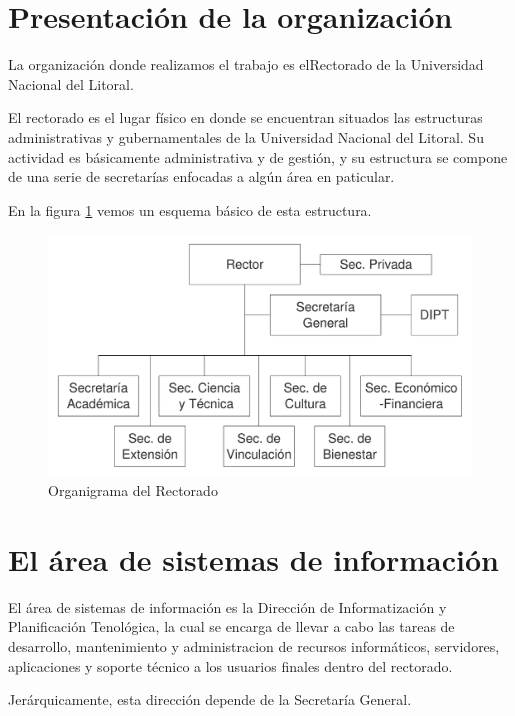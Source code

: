 \documentclass[a4paper,11pt,oneside]{article}
\begin{document}
\maketitle
%
%
\section{Presentación de la organización}
%
La organización donde realizamos el trabajo es elRectorado de la Universidad
Nacional del Litoral.

El rectorado es el lugar físico en donde se encuentran situados las
estructuras administrativas y gubernamentales de la Universidad
Nacional del Litoral.
Su actividad es básicamente administrativa y de gestión, y su estructura
se compone de una serie de secretarías enfocadas a algún área en
paticular.

En la figura \ref{organi-rectorado} vemos un esquema básico de esta
estructura.
%
\begin{figure}[H]
  \center\includegraphics[width=127mm]{img/organi_rectorado}
  \caption{Organigrama del Rectorado}
  \label{organi-rectorado}
\end{figure}
%
\section{El área de sistemas de información}
%
El área de sistemas de información es la Dirección de Informatización
y Planificación Tenológica, la cual se encarga de llevar a cabo las
tareas de desarrollo, mantenimiento y administracion de recursos
informáticos, servidores, aplicaciones y soporte técnico a los
usuarios finales dentro del rectorado.

Jerárquicamente, esta dirección depende de la Secretaría General.
%
\end{document}
